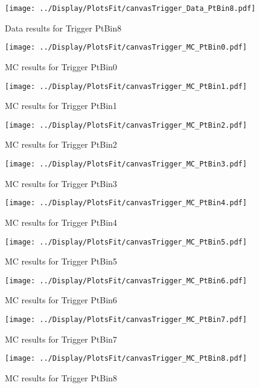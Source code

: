 \documentclass{article}
\begin{document}
\begin{figure}
    \texttt{[image: ../Display/PlotsFit/canvasTrigger\_Data\_PtBin8.pdf]}
    \caption{Data results for Trigger PtBin8 }
\end{figure}


\begin{figure}
    \texttt{[image: ../Display/PlotsFit/canvasTrigger\_MC\_PtBin0.pdf]}
    \caption{MC results for Trigger PtBin0 }
\end{figure}

\begin{figure}
    \texttt{[image: ../Display/PlotsFit/canvasTrigger\_MC\_PtBin1.pdf]}
    \caption{MC results for Trigger PtBin1 }
\end{figure}

\begin{figure}
    \texttt{[image: ../Display/PlotsFit/canvasTrigger\_MC\_PtBin2.pdf]}
    \caption{MC results for Trigger PtBin2 }
\end{figure}

\begin{figure}
    \texttt{[image: ../Display/PlotsFit/canvasTrigger\_MC\_PtBin3.pdf]}
    \caption{MC results for Trigger PtBin3 }
\end{figure}

\begin{figure}
    \texttt{[image: ../Display/PlotsFit/canvasTrigger\_MC\_PtBin4.pdf]}
    \caption{MC results for Trigger PtBin4 }
\end{figure}

\begin{figure}
    \texttt{[image: ../Display/PlotsFit/canvasTrigger\_MC\_PtBin5.pdf]}
    \caption{MC results for Trigger PtBin5 }
\end{figure}

\begin{figure}
    \texttt{[image: ../Display/PlotsFit/canvasTrigger\_MC\_PtBin6.pdf]}
    \caption{MC results for Trigger PtBin6 }
\end{figure}

\begin{figure}
    \texttt{[image: ../Display/PlotsFit/canvasTrigger\_MC\_PtBin7.pdf]}
    \caption{MC results for Trigger PtBin7 }
\end{figure}

\begin{figure}
    \texttt{[image: ../Display/PlotsFit/canvasTrigger\_MC\_PtBin8.pdf]}
    \caption{MC results for Trigger PtBin8 }
\end{figure}
\end{document}
